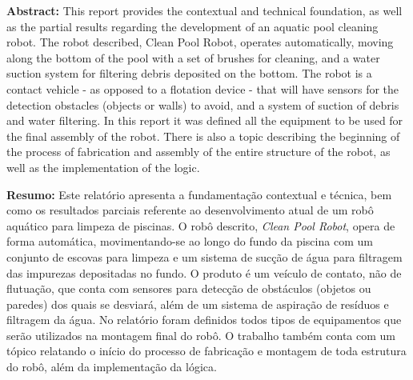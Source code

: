 \begin{abstractenv}
\textbf{Abstract:} This report provides the contextual and technical foundation, as well as the partial results  regarding the development of an aquatic pool cleaning robot. The robot described, Clean Pool Robot, operates automatically, moving along the bottom of the pool with a set of brushes for cleaning, and a water suction system for filtering debris deposited on the bottom. The robot is a contact vehicle - as opposed to a flotation device - that will have sensors for the detection obstacles (objects or walls) to avoid, and a system of suction of debris and water filtering. In this report it was defined all the equipment to be used for the final assembly of the robot. There is also a topic describing the beginning of the process of fabrication and assembly of the entire structure of the robot, as well as the implementation of the logic.
\end{abstractenv}


\begin{abstractenv}
\textbf{Resumo:} Este relatório apresenta a fundamentação contextual e técnica, bem como os resultados parciais referente ao desenvolvimento atual de um robô aquático para limpeza de piscinas. O robô descrito, \textit{Clean Pool Robot}, opera de forma automática, movimentando-se ao longo do fundo da piscina com um conjunto de escovas para limpeza e um sistema de sucção de água para filtragem das impurezas depositadas no fundo. O produto é um veículo de contato, não de flutuação, que conta com sensores para detecção de obstáculos (objetos ou paredes) dos quais se desviará, além de um sistema de aspiração de resíduos e filtragem da água. No relatório foram definidos todos tipos de equipamentos que serão utilizados na montagem final do robô. O trabalho também conta com um tópico relatando o início do processo de fabricação e montagem de toda estrutura do robô, além da implementação da lógica.
\end{abstractenv}